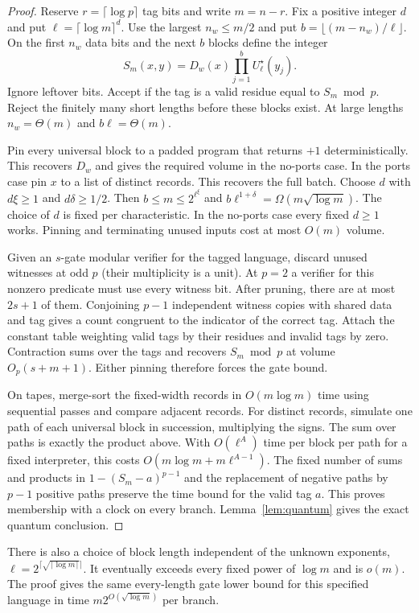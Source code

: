 \documentclass[11pt]{article}
\theoremstyle{definition}
\theoremstyle{remark}
\begin{document}
\begin{proof}
Reserve $r=\lceil\log p\rceil$ tag bits and write $m=n-r$. Fix a
positive integer $d$ and put $\ell=\lceil\log m\rceil^d$. Use the
largest $n_w\le m/2$ and put $b=\lfloor(m-n_w)/\ell\rfloor$. On the
first $n_w$ data bits and the next $b$ blocks define the integer
\[
       S_m(x,y)=D_w(x)\prod_{j=1}^b U_\ell^\star(y_j).
\]
Ignore leftover bits. Accept if the tag is a valid residue equal to
$S_m\bmod p$. Reject the finitely many short lengths before these
blocks exist. At large lengths $n_w=\Theta(m)$ and $b\ell=\Theta(m)$.

Pin every universal block to a padded program that returns $+1$
deterministically. This recovers $D_w$ and gives the required volume
in the no-ports case. In the ports case pin $x$ to a list of distinct
records. This recovers the full batch. Choose $d$ with $d\xi\ge1$
and $d\delta\ge1/2$. Then $b\le m\le2^{\ell^\xi}$ and
$b\ell^{1+\delta}=\Omega(m\sqrt{\log m})$. The choice of $d$ is fixed
per characteristic. In the no-ports case every fixed $d\ge1$ works.
Pinning and terminating unused inputs cost at most $O(m)$ volume.

Given an $s$-gate modular verifier for the tagged language, discard
unused witnesses at odd $p$ (their multiplicity is a unit). At $p=2$
a verifier for this nonzero predicate must use every witness bit.
After pruning, there are at most $2s+1$ of them. Conjoining $p-1$
independent witness copies with shared data and tag gives a count
congruent to the indicator of the correct tag. Attach the constant
table weighting valid tags by their residues and invalid tags by
zero. Contraction sums over the tags and recovers $S_m\bmod p$ at
volume $O_p(s+m+1)$. Either pinning therefore forces the gate bound.

On tapes, merge-sort the fixed-width records in $O(m\log m)$ time
using sequential passes and compare adjacent records. For distinct
records, simulate one path of each universal block in succession,
multiplying the signs. The sum over paths is exactly the product
above. With $O(\ell^A)$ time per block per path for a fixed interpreter,
this costs $O(m\log m+m\ell^{A-1})$. The fixed number of sums and
products in $1-(S_m-a)^{p-1}$ and the replacement of negative paths
by $p-1$ positive paths preserve the time bound for the valid tag $a$.
This proves membership with a clock on every branch.
Lemma~\ref{lem:quantum} gives the exact quantum conclusion.
\end{proof}
There is also a choice of block length independent of the unknown
exponents, $\ell=2^{\lceil\sqrt{\lceil\log m\rceil}\rceil}$.
It eventually exceeds every fixed power of $\log m$ and is $o(m)$.
The proof gives the same every-length gate lower bound for this
specified language in time $m2^{O(\sqrt{\log m})}$ per branch.
\end{document}
